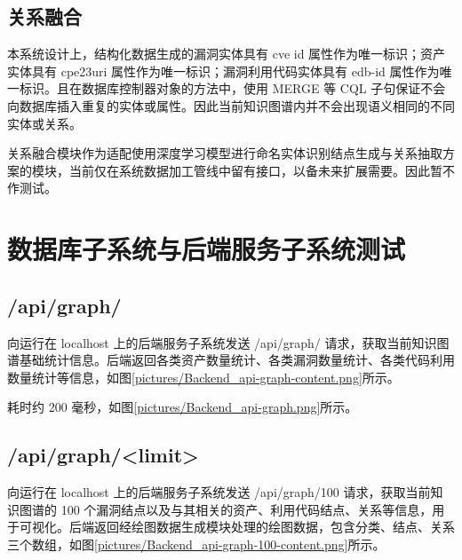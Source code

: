 \documentclass[a4paper,AutoFakeBold,oneside,12pt]{book}
\begin{document}


\subsection{关系融合}

本系统设计上，结构化数据生成的漏洞实体具有 cve id 属性作为唯一标识；资产实体具有 cpe23uri 属性作为唯一标识；漏洞利用代码实体具有 edb-id 属性作为唯一标识。且在数据库控制器对象的方法中，使用 MERGE 等 CQL 子句保证不会向数据库插入重复的实体或属性。因此当前知识图谱内并不会出现语义相同的不同实体或关系。

关系融合模块作为适配使用深度学习模型进行命名实体识别结点生成与关系抽取方案的模块，当前仅在系统数据加工管线中留有接口，以备未来扩展需要。因此暂不作测试。

\section{数据库子系统与后端服务子系统测试}

\subsection{/api/graph/}

向运行在 localhost 上的后端服务子系统发送 /api/graph/ 请求，获取当前知识图谱基础统计信息。后端返回各类资产数量统计、各类漏洞数量统计、各类代码利用数量统计等信息，如图\ref{pictures/Backend_api-graph-content.png}所示。


耗时约 200 毫秒，如图\ref{pictures/Backend_api-graph.png}所示。


\subsection{/api/graph/<limit>}

向运行在 localhost 上的后端服务子系统发送 /api/graph/100 请求，获取当前知识图谱的 100 个漏洞结点以及与其相关的资产、利用代码结点、关系等信息，用于可视化。后端返回经绘图数据生成模块处理的绘图数据，包含分类、结点、关系三个数组，如图\ref{pictures/Backend_api-graph-100-content.png}所示。
\end{document}
